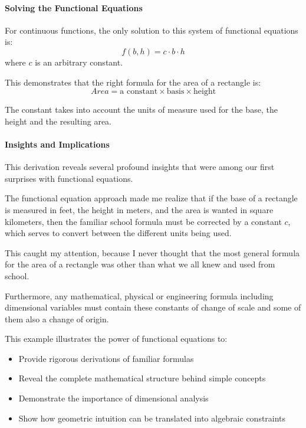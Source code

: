 \paragraph{Solving the Functional Equations}
For continuous functions, the only solution to this system of functional equations is:
\begin{equation}
\boxed{f(b, h) = c \cdot b \cdot h}
\end{equation}
where $c$ is an arbitrary constant.

This demonstrates that the right formula for the area of a rectangle is:
\begin{equation}
\boxed{Area = \text{a constant} \times \text{basis} \times \text{height}}
\end{equation}

The constant takes into account the units of measure used for the base, the height and the resulting area.

\paragraph{Insights and Implications}
This derivation reveals several profound insights that were among our first surprises with functional equations.

The functional equation approach made me realize that if the base of a rectangle is measured in feet, the height in meters, and the area is wanted in square kilometers, then the familiar school formula must be corrected by a constant $c$, which serves to convert between the different units being used.

This caught my attention, because I never thought that the most general formula for the area of a rectangle was other than what we all knew and used from school.

Furthermore, any mathematical, physical or engineering formula including dimensional variables must contain these constants of change of scale and some of them also a change of origin.

This example illustrates the power of functional equations to:
\begin{itemize}
\item Provide rigorous derivations of familiar formulas
\item Reveal the complete mathematical structure behind simple concepts
\item Demonstrate the importance of dimensional analysis
\item Show how geometric intuition can be translated into algebraic constraints
\end{itemize}


